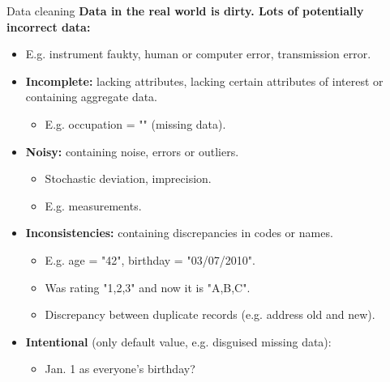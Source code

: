 \documentclass[aspectratio=169,t]{beamer}
\begin{document}
  { 
    \begin{frame}{Data cleaning}
      \textbf{Data in the real world is {\color{airforceblue}dirty}. Lots of potentially incorrect data:}
      \begin{itemize}
        \item E.g. instrument faukty, human or computer error, transmission error.
        \item \textbf{\color{airforceblue}Incomplete:} lacking attributes, lacking certain attributes of interest or containing aggregate data.
        \begin{itemize}
          \item E.g. occupation = "" (missing data).
        \end{itemize}
        \item \textbf{\color{airforceblue}Noisy:} containing noise, errors or outliers.
        \begin{itemize}
          \item Stochastic deviation, imprecision.
          \item E.g. measurements.
        \end{itemize}
        \item \textbf{\color{airforceblue}Inconsistencies:} containing discrepancies in codes or names.
        \begin{itemize}
          \item E.g. age = "42", birthday = "03/07/2010".
          \item Was rating "1,2,3" and now it is "A,B,C".
          \item Discrepancy between duplicate records (e.g. address old and new).
        \end{itemize}
        \item \textbf{\color{airforceblue}Intentional} (only default value, e.g. disguised missing data):
        \begin{itemize}
          \item Jan. 1 as everyone's birthday?
        \end{itemize}
      \end{itemize}
    \end{frame}
  }
\end{document}
